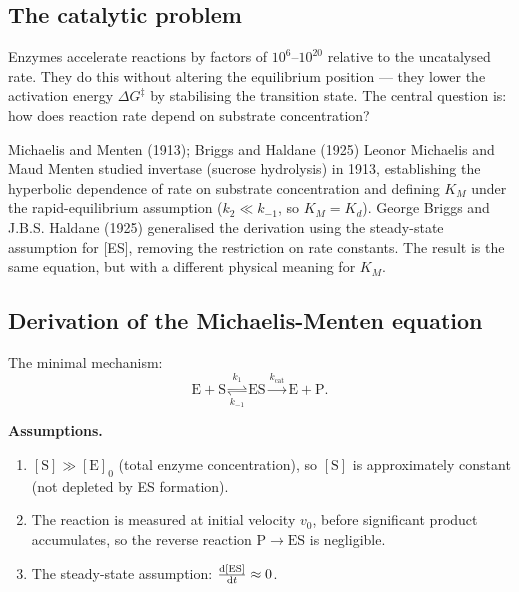 \documentclass[12pt, a4paper, oneside]{report}
\begin{document}
\subsection{The catalytic problem}

Enzymes accelerate reactions by factors of $10^6$--$10^{20}$ relative to
the uncatalysed rate. They do this without altering the equilibrium
position — they lower the activation energy $\Delta G^\ddagger$ by
stabilising the transition state. The central question is: how does
reaction rate depend on substrate concentration?

\begin{historicalnote}{Michaelis and Menten (1913); Briggs and Haldane (1925)}
  Leonor Michaelis and Maud Menten studied invertase (sucrose hydrolysis)
  in 1913, establishing the hyperbolic dependence of rate on substrate
  concentration and defining $K_M$ under the rapid-equilibrium assumption
  ($k_2 \ll k_{-1}$, so $K_M = K_d$). George Briggs and J.B.S. Haldane
  (1925) generalised the derivation using the steady-state assumption for
  [ES], removing the restriction on rate constants. The result is the
  same equation, but with a different physical meaning for $K_M$.
\end{historicalnote}

\subsection{Derivation of the Michaelis-Menten equation}

The minimal mechanism:
\begin{equation}
  \mathrm{E} + \mathrm{S}
    \underset{k_{-1}}{\overset{k_1}{\rightleftharpoons}}
  \mathrm{ES}
    \overset{k_\text{cat}}{\longrightarrow}
  \mathrm{E} + \mathrm{P}.
  \label{eq:mmechanism}
\end{equation}

\textbf{Assumptions.}
\begin{enumerate}
  \item $[\mathrm{S}] \gg [\mathrm{E}]_0$ (total enzyme concentration),
        so $[\mathrm{S}]$ is approximately constant (not depleted by ES
        formation).
  \item The reaction is measured at initial velocity $v_0$, before
        significant product accumulates, so the reverse reaction
        $\mathrm{P} \to \mathrm{ES}$ is negligible.
  \item The steady-state assumption: $\frac{\mathrm{d}[\mathrm{ES}]}{\mathrm{d}t} \approx 0$.
\end{enumerate}
\end{document}
